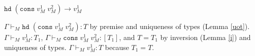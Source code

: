 \begin{case}
$\mathtt{hd}\;(\mathtt{cons}\;v_{M}^{1}\;v_{M}^{2})\rightarrow v_{M}^{1}$

$\Gamma\vdash_{M}\mathtt{hd}\;(\mathtt{cons}\;v_{M}^{1}\;v_{M}^{2}):T$ by premise and uniqueness of types (Lemma \ref{uot}).  $\Gamma\vdash_{M}v_{M}^{1}:T_{1}$, $\Gamma\vdash_{M}\mathtt{cons}\;v_{M}^{1}\;v_{M}^{2}:[T_{1}]$, and $T=T_{1}$ by inversion (Lemma \ref{i}) and uniqueness of types.  $\Gamma\vdash_{M}v_{M}^{1}:T$ because $T_{1}=T$.
\end{case}